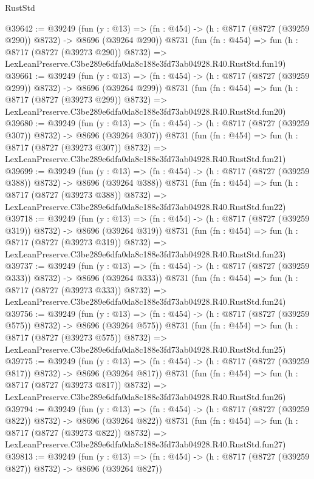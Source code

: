 \begin{lexlean}{RustStd}
\begin{coremodule}
@39642 := @39249
    (fun (y : @13) => (fn : @454) -> (h : @8717 (@8727 (@39259 @290)) @8732) -> @8696 (@39264 @290))
    @8731
    (fun (fn : @454) =>
    fun (h : @8717 (@8727 (@39273 @290)) @8732) =>
    LexLeanPreserve.C3be289e6dfa0da8c188e3fd73ab04928.R40.RustStd.fun19)
@39661 := @39249
    (fun (y : @13) => (fn : @454) -> (h : @8717 (@8727 (@39259 @299)) @8732) -> @8696 (@39264 @299))
    @8731
    (fun (fn : @454) =>
    fun (h : @8717 (@8727 (@39273 @299)) @8732) =>
    LexLeanPreserve.C3be289e6dfa0da8c188e3fd73ab04928.R40.RustStd.fun20)
@39680 := @39249
    (fun (y : @13) => (fn : @454) -> (h : @8717 (@8727 (@39259 @307)) @8732) -> @8696 (@39264 @307))
    @8731
    (fun (fn : @454) =>
    fun (h : @8717 (@8727 (@39273 @307)) @8732) =>
    LexLeanPreserve.C3be289e6dfa0da8c188e3fd73ab04928.R40.RustStd.fun21)
@39699 := @39249
    (fun (y : @13) => (fn : @454) -> (h : @8717 (@8727 (@39259 @388)) @8732) -> @8696 (@39264 @388))
    @8731
    (fun (fn : @454) =>
    fun (h : @8717 (@8727 (@39273 @388)) @8732) =>
    LexLeanPreserve.C3be289e6dfa0da8c188e3fd73ab04928.R40.RustStd.fun22)
@39718 := @39249
    (fun (y : @13) => (fn : @454) -> (h : @8717 (@8727 (@39259 @319)) @8732) -> @8696 (@39264 @319))
    @8731
    (fun (fn : @454) =>
    fun (h : @8717 (@8727 (@39273 @319)) @8732) =>
    LexLeanPreserve.C3be289e6dfa0da8c188e3fd73ab04928.R40.RustStd.fun23)
@39737 := @39249
    (fun (y : @13) => (fn : @454) -> (h : @8717 (@8727 (@39259 @333)) @8732) -> @8696 (@39264 @333))
    @8731
    (fun (fn : @454) =>
    fun (h : @8717 (@8727 (@39273 @333)) @8732) =>
    LexLeanPreserve.C3be289e6dfa0da8c188e3fd73ab04928.R40.RustStd.fun24)
@39756 := @39249
    (fun (y : @13) => (fn : @454) -> (h : @8717 (@8727 (@39259 @575)) @8732) -> @8696 (@39264 @575))
    @8731
    (fun (fn : @454) =>
    fun (h : @8717 (@8727 (@39273 @575)) @8732) =>
    LexLeanPreserve.C3be289e6dfa0da8c188e3fd73ab04928.R40.RustStd.fun25)
@39775 := @39249
    (fun (y : @13) => (fn : @454) -> (h : @8717 (@8727 (@39259 @817)) @8732) -> @8696 (@39264 @817))
    @8731
    (fun (fn : @454) =>
    fun (h : @8717 (@8727 (@39273 @817)) @8732) =>
    LexLeanPreserve.C3be289e6dfa0da8c188e3fd73ab04928.R40.RustStd.fun26)
@39794 := @39249
    (fun (y : @13) => (fn : @454) -> (h : @8717 (@8727 (@39259 @822)) @8732) -> @8696 (@39264 @822))
    @8731
    (fun (fn : @454) =>
    fun (h : @8717 (@8727 (@39273 @822)) @8732) =>
    LexLeanPreserve.C3be289e6dfa0da8c188e3fd73ab04928.R40.RustStd.fun27)
@39813 := @39249
    (fun (y : @13) => (fn : @454) -> (h : @8717 (@8727 (@39259 @827)) @8732) -> @8696 (@39264 @827))

\end{coremodule}
\end{lexlean}
